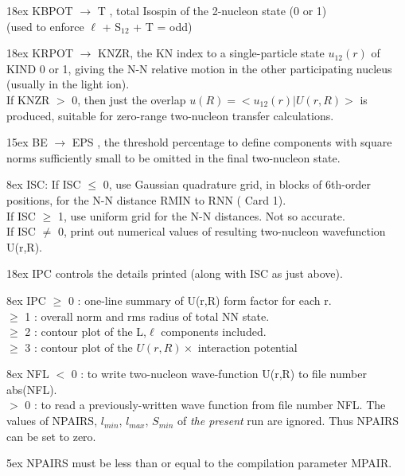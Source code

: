\documentclass[11pt]{article}
\begin{document}
\hangindent 18ex
KBPOT $\rightarrow$ T     , total Isospin  of the 2-nucleon state (0 or 1)
\\
(used to enforce  $\ell$ + S$_{12}$ + T = odd)

\hangindent 18ex
KRPOT $\rightarrow$ KNZR, the KN index to a single-particle state $u_{12}(r)$
of KIND 0 or 1, giving the N-N relative motion in the
other participating nucleus (usually in the light ion).
\\
If KNZR $>$ 0, then just the overlap $ u(R)  =  <u_{12}(r) | U(r,R) > $ is
produced, suitable for zero-range two-nucleon transfer calculations.

\hangindent 15ex
BE    $\rightarrow$ EPS   , the threshold percentage to define components with
square norms sufficiently small to be omitted in the final two-nucleon
state.

\hangindent 8ex  ISC:
      If ISC $\le$ 0, use Gaussian quadrature grid, in blocks of 6th-order
      positions, for the N-N distance RMIN to RNN ( Card 1).
\\  If ISC $\geq$ 1, use uniform grid for the N-N distances.  Not so accurate.
\\  If ISC $\neq$ 0, print out numerical values of resulting two-nucleon wavefunction
U(r,R).



\hangindent 18ex
IPC controls the details printed (along with ISC as just above).

\hangindent 8ex  IPC
      $\geq$ 0 : one-line summary of U(r,R) form factor for each r.
\\  $\geq$ 1 : overall norm and rms radius of total NN state.
\\  $\geq$ 2 : contour plot of the L,$\ell$ components included.
\\  $\geq$ 3 : contour plot of the $U(r,R) \times$ interaction potential



\hangindent 8ex  NFL
      $<$ 0    : to write two-nucleon wave-function U(r,R) to file
number abs(NFL).
\\  $>$ 0 : to read a previously-written wave function from file number
NFL.  The values of NPAIRS, $l_{min}$, $l_{max}$, $S_{min}$ of
{\em the present}
run are ignored.  Thus NPAIRS can be set to zero.



\hangindent 5ex
NPAIRS must be less than or equal to the compilation parameter MPAIR.
\end{document}

